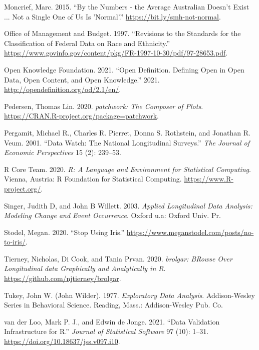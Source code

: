 \documentclass[12pt]{article}
\newlength{\cslhangindent}
\newlength{\cslentryspacingunit} %
\newenvironment{CSLReferences}[2] %
 {%
  \setlength{\parindent}{0pt}
  \ifodd #1
  \let\oldpar\par
  \def\par{\hangindent=\cslhangindent\oldpar}
  \fi
  \setlength{\parskip}{#2\cslentryspacingunit}
 }%
 {}
\begin{document}
\begin{CSLReferences}{1}{0}
\leavevmode{}%
Moncrief, Marc. 2015. {``By the Numbers - the Average Australian Doesn't Exist ... Not a Single One of Us Is 'Normal'.''} \url{https://bit.ly/smh-not-normal}.

\leavevmode{}%
Office of Management and Budget. 1997. {``Revisions to the Standards for the Classification of Federal Data on Race and Ethnicity.''} \url{https://www.govinfo.gov/content/pkg/FR-1997-10-30/pdf/97-28653.pdf}.

\leavevmode{}%
Open Knowledge Foundation. 2021. {``Open Definition. Defining Open in Open Data, Open Content, and Open Knowledge.''} 2021. \url{http://opendefinition.org/od/2.1/en/}.

\leavevmode{}%
Pedersen, Thomas Lin. 2020. \emph{{patchwork: The Composer of Plots}}. \url{https://CRAN.R-project.org/package=patchwork}.

\leavevmode{}%
Pergamit, Michael R., Charles R. Pierret, Donna S. Rothstein, and Jonathan R. Veum. 2001. {``Data Watch: The National Longitudinal Surveys.''} \emph{The Journal of Economic Perspectives} 15 (2): 239--53.

\leavevmode{}%
R Core Team. 2020. \emph{R: A Language and Environment for Statistical Computing}. Vienna, Austria: R Foundation for Statistical Computing. \url{https://www.R-project.org/}.

\leavevmode{}%
Singer, Judith D, and John B Willett. 2003. \emph{Applied Longitudinal Data Analysis: Modeling Change and Event Occurrence}. Oxford u.a: Oxford Univ. Pr.

\leavevmode{}%
Stodel, Megan. 2020. {``Stop Using Iris.''} \url{https://www.meganstodel.com/posts/no-to-iris/}.

\leavevmode{}%
Tierney, Nicholas, Di Cook, and Tania Prvan. 2020. \emph{{brolgar: BRowse Over Longitudinal data Graphically and Analytically in R}}. \url{https://github.com/njtierney/brolgar}.

\leavevmode{}%
Tukey, John W. (John Wilder). 1977. \emph{Exploratory Data Analysis}. Addison-Wesley Series in Behavioral Science. Reading, Mass.: Addison-Wesley Pub. Co.

\leavevmode{}%
van der Loo, Mark P. J., and Edwin de Jonge. 2021. {``Data Validation Infrastructure for {R}.''} \emph{Journal of Statistical Software} 97 (10): 1--31. \url{https://doi.org/10.18637/jss.v097.i10}.


\end{CSLReferences}
\end{document}
